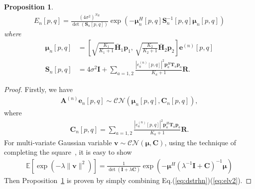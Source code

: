 \documentclass[journal,draftcls,onecolumn,12pt,twoside]{IEEEtran}
\newtheorem{proposition}{Proposition}
\begin{document}
\begin{proposition}
  \begin{align}
      E_n[p,q] =
      \frac{(4\sigma^2)^{N_R}}{\det(\mathbf{S}_n[p,q])}
      \exp\left(-\bm{\mu}_n^H[p,q]\mathbf{S}_n^{-1}[p,q]\bm{\mu}_n[p,q]\right)
  \end{align}
  where 
  \begin{subequations}
    \begin{align}
      \bm{\mu}_n[p,q] & =
      \left[\sqrt{\frac{K_1}{K_1+1}}\bar{\mathbf{H}}_1\mathbf{p}_1
      ,\, \sqrt{\frac{K_2}{K_2+1}}\bar{\mathbf{H}}_2\mathbf{p}_2
      \right]\mathbf{e}^{(n)}[p,q]
      \\
      \mathbf{S}_n[p,q] & =
      4\sigma^2\mathbf{I} +
      \sum_{a=1,2} \frac{|e_a^{(n)}[p,q]|^2 \mathbf{p}_a^H\mathbf{T}_a
      \mathbf{p}_a}{K_a+1} \mathbf{R}.
    \end{align}
  \end{subequations}
  \label{prop:en}
\end{proposition}
\begin{proof}
  Firstly, we have
  \begin{align}
      \mathbf{A}^{(n)}\mathbf{e}_n[p,q]
      \sim\mathcal{CN}(\bm{\mu}_n[p,q],
      \mathbf{C}_n[p,q]), \label{eq:dstrhn}
  \end{align}
  where 
  \begin{align}
    \mathbf{C}_n[p,q] = \sum_{a=1,2}
    \frac{|e_a^{(n)}[p,q]|^2\mathbf{p}_a^H\mathbf{T}_a
    \mathbf{p}_a}{K_a+1}\mathbf{R}.
  \end{align}
  For multi-variate Gaussian variable $\mathbf{v}\sim\mathcal{CN}(\bm{\mu},
    \mathbf{C})$, using the technique of completing the square~\cite[Sec.
    2.3.1]{bishop2006pattern}, it is easy to show
    \begin{align}
        \mathbb{E}\left[\exp(-\lambda\|\mathbf{v}\|^2)\right] =
        \frac{1}{\det(\mathbf{I} +
        \lambda\mathbf{C})}\exp\left(-\bm{\mu}^H(\lambda^{-1}\mathbf{I} +
        \mathbf{C})^{-1}\bm{\mu}\right) \label{eq:elv2}
    \end{align}
    Then Proposition~\ref{prop:en} is proven by simply combining
    Eq.(\ref{eq:dstrhn})(\ref{eq:elv2}).
\end{proof}
\end{document}

